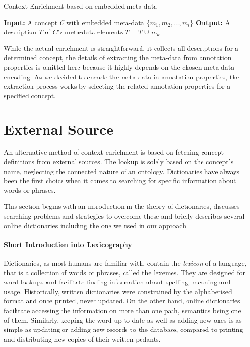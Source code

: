 \documentclass[draft,final]{vutinfth} %
\begin{document}
\begin{algorithm}
	\caption{Context Enrichment based on embedded meta-data}\label{alg:embedded_enrichment}
	\begin{algorithmic}[1]
		\newline
			\textbf{Input:} A concept $C$ with embedded meta-data $\{m_1, m_2, \ldots, m_i \}$\newline
			\textbf{Output:} A description $T$ of $C's$ meta-data elements\newline
				\State $T=T$ $\cup$ $m_k$
			\EndFor
		\EndProcedure
	\end{algorithmic}
\end{algorithm}

While the actual enrichment is straightforward, it collects all descriptions for a determined concept, the details of extracting the meta-data from annotation properties is omitted here because it highly depends on the chosen meta-data encoding.
As we decided to encode the meta-data in annotation properties, the extraction process works by selecting the related annotation properties for a specified concept. 

\section{External Source}\label{sec:external_source}
An alternative method of context enrichment is based on fetching concept definitions from external sources. The lookup is solely based on the concept's name, neglecting the connected nature of an ontology. Dictionaries have always been the first choice when it comes to searching for specific information about words or phrases.

This section begins with an introduction in the theory of dictionaries, discusses searching problems and strategies to overcome these and briefly describes several online dictionaries including the one we used in our approach.

\paragraph{Short Introduction into Lexicography}
Dictionaries, as most humans are familiar with, contain the \textit{lexicon} of a language, that is a collection of words or phrases, called the lexemes. 
They are designed for word lookups and facilitate finding information about spelling, meaning and usage. Historically, written dictionaries were constrained by the alphabetised format and once printed, never updated. On the other hand, online dictionaries facilitate accessing the information on more than one path, semantics being one of them. Similarly, keeping the word up-to-date as well as adding new ones is as simple as updating or adding new records to the database, compared to printing and distributing new copies of their written pedants. 
\end{document}
